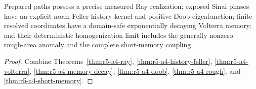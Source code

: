 \begin{theorem}
\label{thm:r5-a4-main}
Prepared paths possess a precise measured Ray realization; exposed Sinai
phases have an explicit norm-Feller history kernel and positive Doob
eigenfunction; finite resolved coordinates have a domain-safe exponentially
decaying Volterra memory; and their deterministic homogenization limit
includes the generally nonzero rough-area anomaly and the complete
short-memory coupling.
\end{theorem}

\begin{proof}
Combine Theorems~\ref{thm:r5-a4-ray},
\ref{thm:r5-a4-history-feller}, \ref{thm:r5-a4-volterra},
\ref{thm:r5-a4-memory-decay}, \ref{thm:r5-a4-doob},
\ref{thm:r5-a4-rough}, and \ref{thm:r5-a4-short-memory}.
\end{proof}
